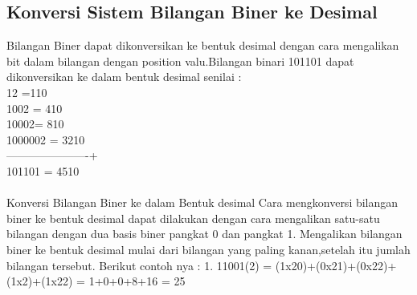 \subsection{Konversi Sistem Bilangan Biner ke Desimal}
Bilangan Biner dapat dikonversikan ke bentuk desimal dengan cara mengalikan bit dalam bilangan dengan position valu\enya.Bilangan binari 101101 dapat dikonversikan ke dalam bentuk desimal senilai :
\\  12	=110\\
1002	= 410\\
10002= 810\\
1000002 = 3210\\
----------------------+\\
101101 = 4510\\
\\ Konversi Bilangan Biner ke dalam Bentuk desimal
Cara mengkonversi bilangan biner ke  bentuk desimal dapat dilakukan dengan cara mengalikan satu-satu bilangan  dengan dua basis biner pangkat 0 dan pangkat 1. Mengalikan bilangan biner ke bentuk desimal mulai dari bilangan yang paling kanan,setelah itu jumlah bilangan tersebut. Berikut contoh nya : 
1.	11001(2) = (1x20)+(0x21)+(0x22)+(1x2)+(1x22)
               = 1+0+0+8+16
               = 25


